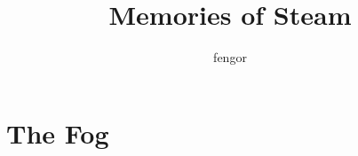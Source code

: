 \documentclass[a4paper,smart,nonsubmission]{sffms}
\title{Memories of Steam}
\author{fengor}
\begin{document}
\chapter{The Fog}


\end{document}
